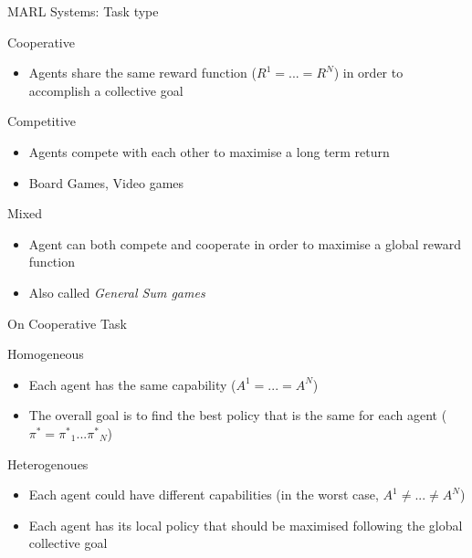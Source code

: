 \documentclass[presentation]{beamer}\mode<presentation>{\usetheme{AMSBolognaFC}}
\begin{document}
\begin{frame}{MARL Systems: Task type}
	\begin{alertblock}{Cooperative}
		\begin{itemize}
			\item Agents share the same reward function ($R^1 = ... = R^N$) in order to accomplish a collective goal
		\end{itemize}
	\end{alertblock}
	\begin{exampleblock}{Competitive}
		\begin{itemize}
			\item Agents compete with each other to maximise a long term return
			\item Board Games, Video games
		\end{itemize}
	\end{exampleblock}
	\begin{exampleblock}{Mixed}
		\begin{itemize}
			\item Agent can both compete and cooperate in order to maximise a global reward function
			\item Also called \textit{General Sum games}
		\end{itemize}
	\end{exampleblock}
\end{frame}
\begin{frame}{On Cooperative Task}
	\begin{exampleblock}{Homogeneous}
		\begin{itemize}
			\item Each agent has the same capability ($A^1 = ... = A^N$)
			\item The overall goal is to find the best policy that is the same for each agent ($\pi^* = {\pi^{*}}_1 ... {\pi^{*}}_N$)
		\end{itemize}
	\end{exampleblock}
	\begin{exampleblock}{Heterogenoues}
		\begin{itemize}
			\item Each agent could have different capabilities (in the worst case, $A^1 \neq ... \neq A^N$)
			\item Each agent has its local policy that should be maximised following the global collective goal
		\end{itemize}
	\end{exampleblock}
\end{frame}
\end{document}
